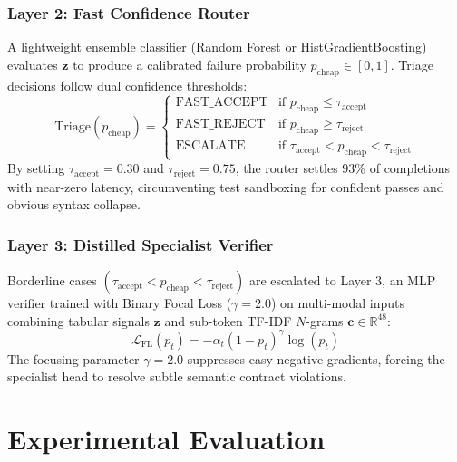 \subsubsection{Layer 2: Fast Confidence Router}
A lightweight ensemble classifier (Random Forest or HistGradientBoosting) evaluates $\mathbf{z}$ to produce a calibrated failure probability $p_{\text{cheap}} \in [0, 1]$. Triage decisions follow dual confidence thresholds:
\begin{equation}
    \text{Triage}(p_{\text{cheap}}) = \begin{cases}
        \text{FAST\_ACCEPT} & \text{if } p_{\text{cheap}} \le \tau_{\text{accept}} \\
        \text{FAST\_REJECT} & \text{if } p_{\text{cheap}} \ge \tau_{\text{reject}} \\
        \text{ESCALATE}     & \text{if } \tau_{\text{accept}} < p_{\text{cheap}} < \tau_{\text{reject}}
    \end{cases}
\end{equation}
By setting $\tau_{\text{accept}} = 0.30$ and $\tau_{\text{reject}} = 0.75$, the router settles 93\% of completions with near-zero latency, circumventing test sandboxing for confident passes and obvious syntax collapse.

\subsubsection{Layer 3: Distilled Specialist Verifier}
Borderline cases $(\tau_{\text{accept}} < p_{\text{cheap}} < \tau_{\text{reject}})$ are escalated to Layer 3, an MLP verifier trained with Binary Focal Loss ($\gamma = 2.0$) on multi-modal inputs combining tabular signals $\mathbf{z}$ and sub-token TF-IDF $N$-grams $\mathbf{c} \in \mathbb{R}^{48}$:
\begin{equation}
    \mathcal{L}_{\text{FL}}(p_t) = -\alpha_t (1 - p_t)^\gamma \log(p_t)
\end{equation}
The focusing parameter $\gamma = 2.0$ suppresses easy negative gradients, forcing the specialist head to resolve subtle semantic contract violations.


\section{Experimental Evaluation}
\label{sec:experiments}

